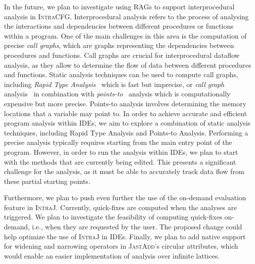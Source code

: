 In the future, we plan to investigate using RAGs to support interprocedural analysis in \textsc{IntraCFG}.
Interprocedural analysis refers to the process of analysing
the interactions and dependencies between different procedures or functions within a
program. One of the main challenges in this area is the computation of precise \emph{call graphs},
which are graphs representing the dependencies between procedures and functions.
Call graphs are crucial for interprocedural dataflow analysis, as they allow to determine
the flow of data between different procedures and functions.
Static analysis techniques can be used to compute call graphs, including \emph{Rapid
Type Analysis}~\cite{bacon1996fast} which is fast but imprecise, or \emph{call graph} analysis~\cite{SootJavaBytecode2010} in combination with \emph{points-to}~\cite{steensgaard1996points} analysis 
which is computationally expensive but more precise. Points-to analysis involves determining 
the memory locations that a variable may point to. 
In order to achieve accurate and efficient program analysis within IDEs,
we aim to explore a combination of static analysis techniques, including
Rapid Type Analysis and Points-to Analysis. 
Performing a precise analysis typically requires starting from the main entry 
point of the program. However, in order to run the analysis within IDEs, we plan 
to start with the methods that are currently being edited. This presents a significant 
challenge for the analysis, as it must be able to accurately track data flow from 
these partial starting points.

Furthermore, we plan to push even further the use of the on-demand evaluation
feature in \textsc{IntraJ}. Currently, quick-fixes are computed when the analyses are triggered.
We plan to investigate the feasibility of computing quick-fixes on-demand,
i.e., when they are requested by the user.
The proposed change could help optimize the use of \textsc{IntraJ} in IDEs.
Finally, we plan to add native support for widening and narrowing
operators in \textsc{JastAdd}'s circular attributes, which would enable an easier implementation
of analysis over infinite lattices.
